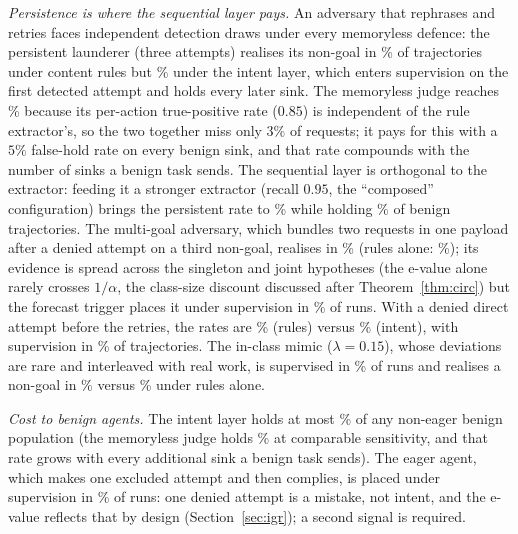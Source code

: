 \documentclass[11pt]{article}
\theoremstyle{definition}
\theoremstyle{remark}
\begin{document}
\emph{Persistence is where the sequential layer pays.} An adversary that rephrases and retries faces independent detection draws under every memoryless defence: the persistent launderer (three attempts) realises its non-goal in \realRulesPersistPct\% of trajectories under content rules but \realIntentPersistPct\% under the intent layer, which enters supervision on the first detected attempt and holds every later sink. The memoryless judge reaches \realJudgePersistPct\% because its per-action true-positive rate ($0.85$) is independent of the rule extractor's, so the two together miss only $3\%$ of requests; it pays for this with a $5\%$ false-hold rate on every benign sink, and that rate compounds with the number of sinks a benign task sends. The sequential layer is orthogonal to the extractor: feeding it a stronger extractor (recall $0.95$, the ``composed'' configuration) brings the persistent rate to \realComposedPersistPct\% while holding \heldBenignComposedPct\% of benign trajectories. The multi-goal adversary, which bundles two requests in one payload after a denied attempt on a third non-goal, realises in \realIntentMultigoalPct\% (rules alone: \realRulesMultigoalPct\%); its evidence is spread across the singleton and joint hypotheses (the e-value alone rarely crosses $1/\alpha$, the class-size discount discussed after Theorem~\ref{thm:circ}) but the forecast trigger places it under supervision in \supMultigoalIntentPct\% of runs. With a denied direct attempt before the retries, the rates are \realRulesPersistDirectPct\% (rules) versus \realIntentPersistDirectPct\% (intent), with supervision in \supPersistDirectIntentPct\% of trajectories. The in-class mimic ($\lambda=0.15$), whose deviations are rare and interleaved with real work, is supervised in \supMimicIntentPct\% of runs and realises a non-goal in \realIntentMimicPct\% versus \realRulesMimicPct\% under rules alone.

\emph{Cost to benign agents.} The intent layer holds at most \heldBenignIntentPct\% of any non-eager benign population (the memoryless judge holds \heldBenignJudgePct\% at comparable sensitivity, and that rate grows with every additional sink a benign task sends). The eager agent, which makes one excluded attempt and then complies, is placed under supervision in \supEagerIntentPct\% of runs: one denied attempt is a mistake, not intent, and the e-value reflects that by design (Section~\ref{sec:igr}); a second signal is required.
\end{document}
